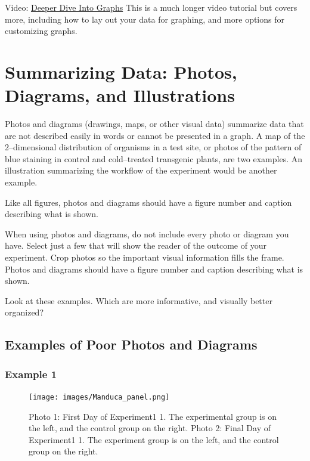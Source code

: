 \documentclass[
]{book}
\begin{document}
Video: \href{https://www.youtube.com/watch?v=hVRVe-JUZd0}{Deeper Dive Into Graphs}
This is a much longer video tutorial but covers more, including how to lay out your data for graphing, and more options for customizing graphs.

\hypertarget{photos430}{%
\chapter{Summarizing Data: Photos, Diagrams, and Illustrations}\label{photos430}}

Photos and diagrams (drawings, maps, or other visual data) summarize data that are not described easily in words or cannot be presented in a graph. A map of the 2--dimensional distribution of organisms in a test site, or photos of the pattern of blue staining in control and cold--treated transgenic plants, are two examples. An illustration summarizing the workflow of the experiment would be another example.

Like all figures, photos and diagrams should have a figure number and caption describing what is shown.

When using photos and diagrams, do not include every photo or diagram you have. Select just a few that will show the reader of the outcome of your experiment. Crop photos so the important visual information fills the frame. Photos and diagrams should have a figure number and caption describing what is shown.

Look at these examples. Which are more informative, and visually better organized?

\hypertarget{examples-of-poor-photos-and-diagrams}{%
\section{Examples of Poor Photos and Diagrams}\label{examples-of-poor-photos-and-diagrams}}

\hypertarget{example-1-12}{%
\subsection{Example 1}\label{example-1-12}}

\begin{figure}
\centering
\texttt{[image: images/Manduca\_panel.png]}
\caption{Photo 1: First Day of Experiment1 1. The experimental group is on the left, and the control group on the right. Photo 2: Final Day of Experiment1 1. The experiment group is on the left, and the control group on the right.}
\end{figure}
\end{document}
